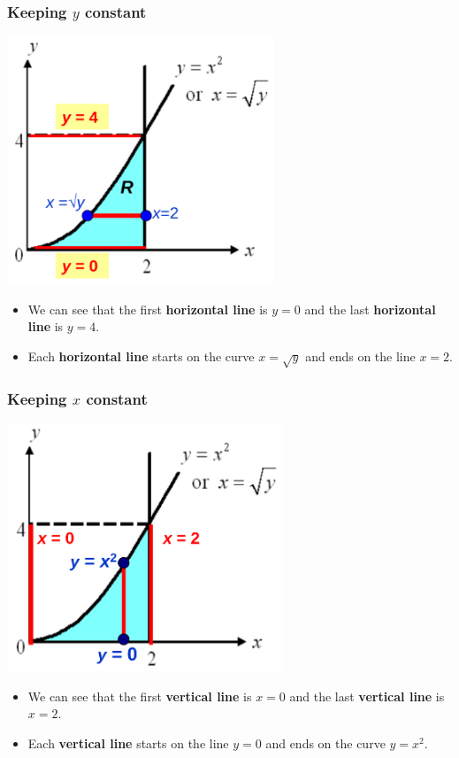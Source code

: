 \documentclass[11pt]{article}
\begin{document}
\subsubsection{Keeping \(y\) constant}
\label{sec:orga643021}
\begin{center}
\includegraphics[height=20em]{./images/double-integral-hold-y-constant.png}
\end{center}
\begin{itemize}
\item We can see that the first \textbf{horizontal line} is \(y = 0\) and the last \textbf{horizontal line} is \(y = 4\).
\item Each \textbf{horizontal line} starts on the curve \(x = \sqrt{y}\) and ends on the line \(x = 2\).
\end{itemize}
\subsubsection{Keeping \(x\) constant}
\label{sec:orgc51c308}
\begin{center}
\includegraphics[height=20em]{./images/double-integral-hold-x-constant.png}
\end{center}
\begin{itemize}
\item We can see that the first \textbf{vertical line} is \(x = 0\) and the last \textbf{vertical line} is \(x = 2\).
\item Each \textbf{vertical line} starts on the line \(y = 0\) and ends on the curve \(y = x^2\).
\end{itemize}
\end{document}
